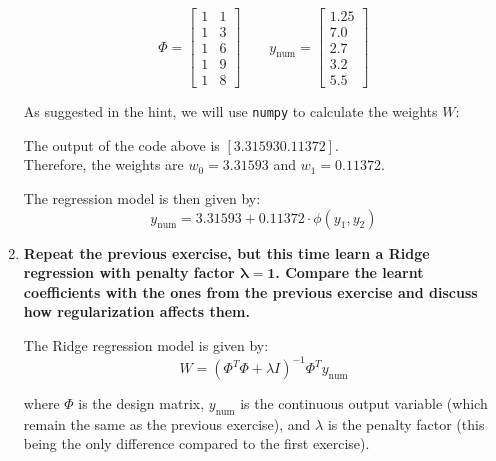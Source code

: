 \documentclass[12pt]{article}
\begin{document}
\begin{enumerate}
    \begin{equation*}
        \Phi = \begin{bmatrix}
            1 & 1 \\
            1 & 3 \\
            1 & 6 \\
            1 & 9 \\
            1 & 8
        \end{bmatrix} \qquad
        y_\text{num} = \begin{bmatrix}
            1.25 \\
            7.0 \\
            2.7 \\
            3.2 \\
            5.5
        \end{bmatrix}
    \end{equation*}

    As suggested in the hint, we will use \texttt{numpy} to calculate the weights $W$:

    \vspace{10pt}
    

    \vspace{10pt}
    The output of the code above is $[3.31593 0.11372]$.\\ 
    Therefore, the weights are $w_0 = 3.31593$ and $w_1 = 0.11372$.

    \vspace{10pt}
    The regression model is then given by:
    \begin{equation*}
        y_\text{num} = 3.31593 + 0.11372 \cdot \phi(y_1, y_2)
    \end{equation*}

    \item \textbf{Repeat the previous exercise, but this time learn a Ridge regression with penalty
    factor $\mathbf{\lambda = 1}$. Compare the learnt coeﬃcients with the ones from the previous exercise and
    discuss how regularization aﬀects them.}

    \vspace{10pt}
    The Ridge regression model is given by:
    \begin{equation*}
        W = (\Phi^T \Phi + \lambda I)^{-1} \Phi^T y_\text{num}
    \end{equation*}
    
    where $\Phi$ is the design matrix, $y_\text{num}$ is the continuous output variable (which remain the same as the previous exercise), and $\lambda$ is the penalty factor (this being the only difference compared to the first exercise).


\end{enumerate}
\end{document}

